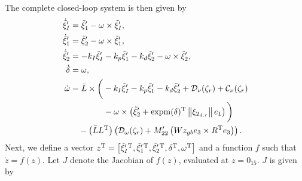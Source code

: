 The complete closed-loop system is then given by
\begin{subequations}
    \begin{align}
        \dot{\tilde{\xi}}_I^{\prime} &= \tilde{\xi}_1^{\prime} - \omega \times \tilde{\xi}_I^{\prime}, \\
        \dot{\tilde{\xi}}_1^{\prime} &= \tilde{\xi}_2^{\prime} - \omega \times \tilde{\xi}_1^{\prime}, \\
        \dot{\tilde{\xi}}_2^{\prime} &= -k_I \tilde{\xi}_I^{\prime} - k_p \tilde{\xi}_1^{\prime} - k_d \tilde{\xi}_2^{\prime} - \omega \times \tilde{\xi}_2^{\prime}, \\
        \dot{\delta} &= \omega, \\
        \dot{\omega} &= \Bar{L} \times \bigg(-k_I \tilde{\xi}_I^{\prime} - k_p \tilde{\xi}_1^{\prime} - k_d \tilde{\xi}_2^{\prime} + \mathcal{D}_{\nu}(\zeta_r) + \mathcal{C}_{\nu}(\zeta_r) \nonumber \\
        &\qquad \qquad - \omega \times \left(\tilde{\xi}_2^{\prime} + {\rm expm}(\delta)^{\mathrm{T}} \left\|\xi_{2_{d,r}}\right\|e_1\right)\bigg) \nonumber \\
        &\quad - \left(\Bar{L}L^{\mathrm{T}}\right) \left(\mathcal{D}_{\omega}(\zeta_r) + M_{22}^{\prime}\left(Wz_{gb} e_3 \times R^{\mathrm{T}} e_3\right)\right).
    \end{align}
\end{subequations}
Next, we define a vector $z^{\mathrm{T}} = \left[{\tilde{\xi}_I^{\prime\,{\rm T}}}, {\tilde{\xi}_1^{\prime\,{\rm T}}}, {\tilde{\xi}_2^{\prime\,{\rm T}}}, \delta^{\mathrm{T}}, \omega^{\mathrm{T}}\right]$ and a function $f$ such that $\dot{z} = f(z)$.
Let $J$ denote the Jacobian of $f(z)$, evaluated at $z = 0_{15}$.
$J$ is given by

